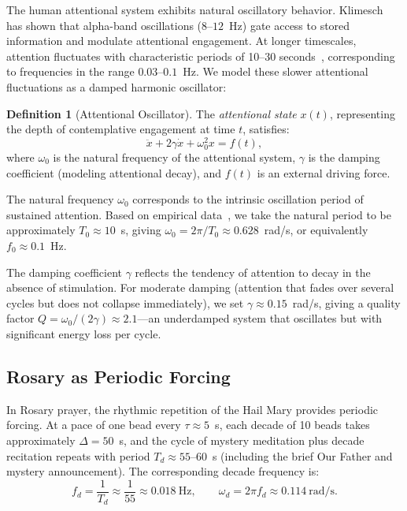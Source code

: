 \documentclass[journal]{IEEEtran}
\theoremstyle{definition}
\newtheorem{definition}[theorem]{Definition}
\theoremstyle{remark}
\begin{document}
The human attentional system exhibits natural oscillatory behavior. Klimesch~\cite{klimesch2012} has shown that alpha-band oscillations ($8$--$12$~Hz) gate access to stored information and modulate attentional engagement. At longer timescales, attention fluctuates with characteristic periods of 10--30 seconds~\cite{braboszcz2011}, corresponding to frequencies in the range $0.03$--$0.1$~Hz. We model these slower attentional fluctuations as a damped harmonic oscillator:

\begin{definition}[Attentional Oscillator]\label{def:att_oscillator}
The \emph{attentional state} $x(t)$, representing the depth of contemplative engagement at time $t$, satisfies:
\begin{equation}\label{eq:attention}
\ddot{x} + 2\gamma\dot{x} + \omega_0^2 x = f(t),
\end{equation}
where $\omega_0$ is the natural frequency of the attentional system, $\gamma$ is the damping coefficient (modeling attentional decay), and $f(t)$ is an external driving force.
\end{definition}

The natural frequency $\omega_0$ corresponds to the intrinsic oscillation period of sustained attention. Based on empirical data~\cite{braboszcz2011,smallwood2006}, we take the natural period to be approximately $T_0 \approx 10$~s, giving $\omega_0 = 2\pi/T_0 \approx 0.628$~rad/s, or equivalently $f_0 \approx 0.1$~Hz.

The damping coefficient $\gamma$ reflects the tendency of attention to decay in the absence of stimulation. For moderate damping (attention that fades over several cycles but does not collapse immediately), we set $\gamma \approx 0.15$~rad/s, giving a quality factor $Q = \omega_0/(2\gamma) \approx 2.1$---an underdamped system that oscillates but with significant energy loss per cycle.

\subsection{Rosary as Periodic Forcing}\label{sec:forcing}

In Rosary prayer, the rhythmic repetition of the Hail Mary provides periodic forcing. At a pace of one bead every $\tau \approx 5$~s, each decade of 10 beads takes approximately $\Delta = 50$~s, and the cycle of mystery meditation plus decade recitation repeats with period $T_d \approx 55$--$60$~s (including the brief Our Father and mystery announcement). The corresponding decade frequency is:
\begin{equation}
f_d = \frac{1}{T_d} \approx \frac{1}{55} \approx 0.018~\text{Hz}, \qquad \omega_d = 2\pi f_d \approx 0.114~\text{rad/s}.
\end{equation}
\end{document}
